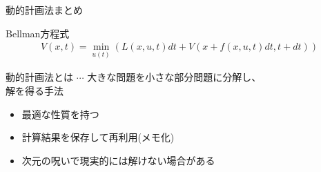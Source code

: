 \documentclass[twocolumn, dvipdfmx,12pt]{beamer}
\begin{document}
    \begin{frame}{動的計画法まとめ}
        \footnotesize

        \begin{block}{Bellman方程式}
            \begin{align*}
                V(x, t) = \min_{u(t)} \left( L(x, u, t) dt + V \left( x + f(x, u, t) dt, t + dt \right) \right)
            \end{align*}
        \end{block}

        動的計画法とは $\cdots$ 大きな問題を小さな部分問題に分解し、\\
        \qquad \qquad \qquad \qquad \quad 解を得る手法

        \begin{itemize}
            \item 最適な性質を持つ
            \item 計算結果を保存して再利用(メモ化)
            \item 次元の呪いで現実的には解けない場合がある
        \end{itemize}
    \end{frame}
\end{document}
